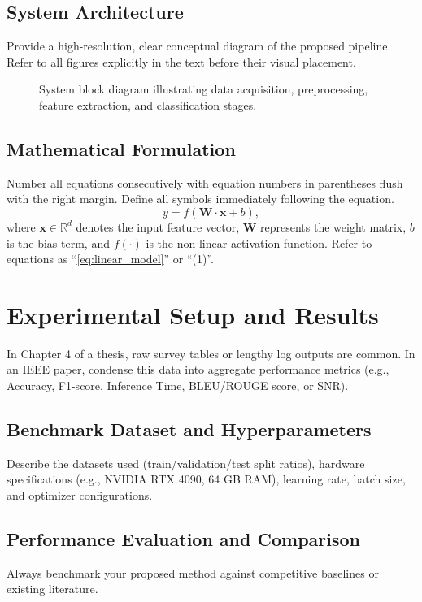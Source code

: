 \documentclass[conference]{IEEEtran}
\begin{document}
\subsection{System Architecture}
Provide a high-resolution, clear conceptual diagram of the proposed pipeline. Refer to all figures explicitly in the text before their visual placement.

\begin{figure}[htbp]
\centerline{\fbox{\rule{0pt}{2in} \rule{0.9\linewidth}{0pt}}}
\caption{System block diagram illustrating data acquisition, preprocessing, feature extraction, and classification stages.}
\label{fig:architecture}
\end{figure}

\subsection{Mathematical Formulation}
Number all equations consecutively with equation numbers in parentheses flush with the right margin. Define all symbols immediately following the equation.
\begin{equation}
y = f(\mathbf{W} \cdot \mathbf{x} + b),
\label{eq:linear_model}
\end{equation}
where $\mathbf{x} \in \mathbb{R}^d$ denotes the input feature vector, $\mathbf{W}$ represents the weight matrix, $b$ is the bias term, and $f(\cdot)$ is the non-linear activation function. Refer to equations as ``\eqref{eq:linear_model}'' or ``(1)''.

\section{Experimental Setup and Results}
\label{sec:results}
In Chapter 4 of a thesis, raw survey tables or lengthy log outputs are common. In an IEEE paper, condense this data into aggregate performance metrics (e.g., Accuracy, F1-score, Inference Time, BLEU/ROUGE score, or SNR).

\subsection{Benchmark Dataset and Hyperparameters}
Describe the datasets used (train/validation/test split ratios), hardware specifications (e.g., NVIDIA RTX 4090, 64 GB RAM), learning rate, batch size, and optimizer configurations.

\subsection{Performance Evaluation and Comparison}
Always benchmark your proposed method against competitive baselines or existing literature. 
\end{document}
